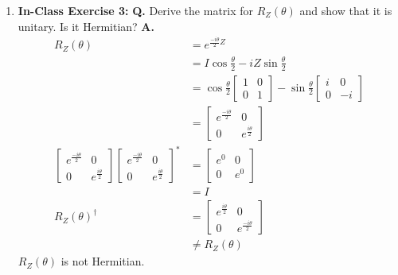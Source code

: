 \documentclass[main.tex]{subfiles}
\begin{document}
\begin{enumerate}
\item[] \textbf{In-Class Exercise 3:} \textbf{Q.} Derive the matrix for $R_{Z}(\theta)$ and show that it is unitary. Is it Hermitian? \textbf{A.}
    \begin{align*}
        R_{Z}(\theta)               & = e^{\frac{-i \theta}{2} Z}\\
                                    & = I\cos \frac{\theta}{2} - i Z\sin\frac{\theta}{2}\\
                                    & = \cos\frac{\theta}{2}\left[\begin{array}{ll}1&0\\0&1\end{array}\right]
                                    -\sin\frac{\theta}{2}\left[\begin{array}{ll}i&0\\0&-i\end{array}\right]\\
                                    & = \left[\begin{array}{cc}e^{\frac{-i \theta}{2}} & 0 \\ 
                                    0 & e^{\frac{i \theta}{2}}\end{array}\right]\\
        \left[\begin{array}{ll}
        e^{\frac{-i \theta}{2}}&0\\ 
        0 & e^{\frac{i \theta}{2}}
        \end{array}\right]
        \left[\begin{array}{ll}
        e^{\frac{-i \theta}{2}}&0\\ 
        0 & e^{\frac{i \theta}{2}}
        \end{array}\right]^*        & = \left[\begin{array}{ll}e^0&0\\0&e^0\end{array}\right]\\
                                    & = I\\
        R_{Z}(\theta)^{\dagger}     & = \left[\begin{array}{ll}e^{\frac{i \theta}{2}}&0\\
                                    0 & e^{\frac{-i \theta}{2}}\end{array}\right]\\
                                    & \neq R_{Z}(\theta)
    \end{align*}
    $R_{Z}(\theta)$ is not Hermitian.
    

\end{enumerate}
\end{document}
